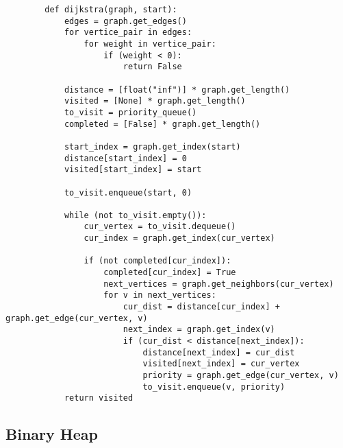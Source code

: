     \begin{lstlisting}
        def dijkstra(graph, start):
            edges = graph.get_edges()
            for vertice_pair in edges:
                for weight in vertice_pair:
                    if (weight < 0):
                        return False
                    
            distance = [float("inf")] * graph.get_length()
            visited = [None] * graph.get_length()
            to_visit = priority_queue()
            completed = [False] * graph.get_length()

            start_index = graph.get_index(start)
            distance[start_index] = 0
            visited[start_index] = start
            
            to_visit.enqueue(start, 0)
            
            while (not to_visit.empty()):
                cur_vertex = to_visit.dequeue()
                cur_index = graph.get_index(cur_vertex)
                
                if (not completed[cur_index]):
                    completed[cur_index] = True
                    next_vertices = graph.get_neighbors(cur_vertex)
                    for v in next_vertices:
                        cur_dist = distance[cur_index] + graph.get_edge(cur_vertex, v)
                        next_index = graph.get_index(v)
                        if (cur_dist < distance[next_index]):
                            distance[next_index] = cur_dist
                            visited[next_index] = cur_vertex
                            priority = graph.get_edge(cur_vertex, v)
                            to_visit.enqueue(v, priority)
            return visited
    \end{lstlisting}

    \newpage





\subsection{ Binary Heap }


